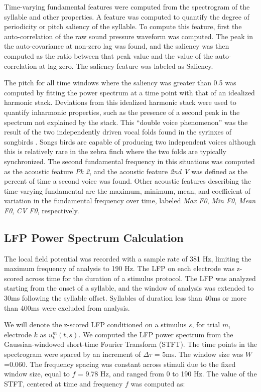 Time-varying fundamental features were computed from the spectrogram of the syllable and other properties. A feature was computed to quantify the degree of periodicity or pitch saliency of the syllable. To compute this feature, first the auto-correlation of the raw sound pressure waveform was computed. The peak in the auto-covariance at non-zero lag was found, and the saliency was then computed as the ratio between that peak value and the value of the auto-correlation at lag zero. The saliency feature was labeled as Saliency.

    The pitch for all time windows where the saliency was greater than 0.5 was computed by fitting the power spectrum at a time point with that of an idealized harmonic stack. Deviations from this idealized harmonic stack were used to quantify inharmonic properties, such as the presence of a second peak in the spectrum not explained by the stack. This ``double voice phenomenon'' was the result of the two independently driven vocal folds found in the syrinxes of songbirds \cite{Suthers1994}. Songs birds are capable of producing two independent voices although this is relatively rare in the zebra finch where the two folds are typically synchronized. The second fundamental frequency in this situations was computed as the acoustic feature {\em Pk 2}, and the acoustic feature {\em 2nd V} was defined as the percent of time a second voice was found. Other acoustic features describing the time-varying fundamental are the maximum, minimum, mean, and coefficient of variation in the fundamental frequency over time, labeled {\em Max F0}, {\em Min F0}, {\em Mean F0}, {\em CV F0}, respectively.


\subsection{LFP Power Spectrum Calculation}
    
    The local field potential was recorded with a sample rate of 381 Hz, limiting the maximum frequency of analysis to 190 Hz. The LFP on each electrode was z-scored across time for the duration of a stimulus protocol. The LFP was analyzed starting from the onset of a syllable, and the window of analysis was extended to 30ms following the syllable offset. Syllables of duration less than 40ms or more than 400ms were excluded from analysis.

    We will denote the z-scored LFP conditioned on a stimulus $s$, for trial $m$, electrode $k$ as $u_k ^m (t, s)$. We computed the LFP power spectrum from the Gaussian-windowed short-time Fourier Transform (STFT). The time points in the spectrogram were spaced by an increment of $\Delta \tau$ = 5ms. The window size was $W$=0.060. The frequency spacing was constant across stimuli due to the fixed window size, equal to $f$ = 9.78 Hz, and ranged from 0 to 190 Hz. The value of the STFT, centered at time  and frequency $f$ was computed as:

